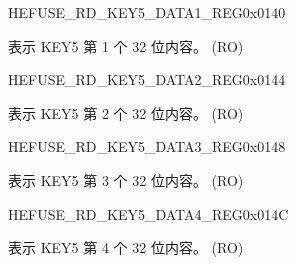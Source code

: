 \begin{register}{H}{EFUSE\_RD\_KEY5\_DATA1\_REG}{0x{}0140}\label{regdesc:EFUSERDKEY5DATA1REG}
%
\regnewline%
\begin{regdesc}\begin{reglist}
\label{fielddesc:EFUSEKEY5DATA1}\item [EFUSE\_KEY5\_DATA1] 表示 KEY5 第 1 个 32 位内容。 (RO)
\end{reglist}\end{regdesc}
\end{register}


\begin{register}{H}{EFUSE\_RD\_KEY5\_DATA2\_REG}{0x{}0144}\label{regdesc:EFUSERDKEY5DATA2REG}
%
\regnewline%
\begin{regdesc}\begin{reglist}
\label{fielddesc:EFUSEKEY5DATA2}\item [EFUSE\_KEY5\_DATA2] 表示 KEY5 第 2 个 32 位内容。 (RO)
\end{reglist}\end{regdesc}
\end{register}


\begin{register}{H}{EFUSE\_RD\_KEY5\_DATA3\_REG}{0x{}0148}\label{regdesc:EFUSERDKEY5DATA3REG}
%
\regnewline%
\begin{regdesc}\begin{reglist}
\label{fielddesc:EFUSEKEY5DATA3}\item [EFUSE\_KEY5\_DATA3] 表示 KEY5 第 3 个 32 位内容。 (RO)
\end{reglist}\end{regdesc}
\end{register}


\begin{register}{H}{EFUSE\_RD\_KEY5\_DATA4\_REG}{0x{}014C}\label{regdesc:EFUSERDKEY5DATA4REG}
%
\regnewline%
\begin{regdesc}\begin{reglist}
\label{fielddesc:EFUSEKEY5DATA4}\item [EFUSE\_KEY5\_DATA4] 表示 KEY5 第 4 个 32 位内容。 (RO)
\end{reglist}\end{regdesc}
\end{register}


